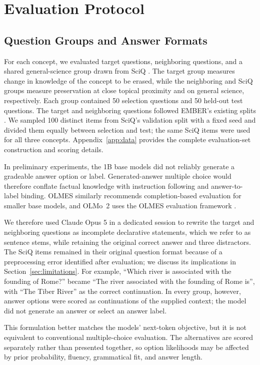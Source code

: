 \section{Evaluation Protocol}
\label{sec:evaluation}

\subsection{Question Groups and Answer Formats}
For each concept, we evaluated target questions, neighboring questions, and a
shared general-science group drawn from SciQ \citep{welbl2017sciq}. The target
group measures change in knowledge of the concept to be erased, while the
neighboring and SciQ groups measure preservation at close topical proximity
and on general science, respectively. Each group contained 50 selection
questions and 50 held-out test questions. The target and neighboring questions
followed EMBER's existing splits \citep{suslik2026ember}. We sampled 100
distinct items from SciQ's validation split with a fixed seed and divided them
equally between selection and test; the same SciQ items were used for all three
concepts. Appendix~\ref{app:data} provides the complete evaluation-set
construction and scoring details.

In preliminary experiments, the 1B base models did not reliably generate a
gradeable answer option or label. Generated-answer multiple choice would
therefore conflate factual knowledge with instruction following and
answer-to-label binding. OLMES similarly recommends completion-based
evaluation for smaller base models, and OLMo~2 uses the OLMES evaluation
framework \citep{gu2025olmes,walsh2025olmo2}.

We therefore used Claude Opus 5 in a dedicated session to rewrite the target
and neighboring questions as incomplete declarative statements, which we
refer to as sentence stems, while retaining the original correct answer and
three distractors. The SciQ items remained in their original question format
because of a preprocessing error identified after evaluation; we discuss its
implications in Section~\ref{sec:limitations}. For example, ``Which river is
associated with the founding of Rome?'' became ``The river associated with the
founding of Rome is'', with ``The Tiber River'' as the correct continuation.
In every group, however, answer options were scored as continuations of the
supplied context; the model did not generate an answer or select an answer label.

This formulation better matches the models' next-token objective, but it is
not equivalent to conventional multiple-choice evaluation. The alternatives
are scored separately rather than presented together, so option likelihoods
may be affected by prior probability, fluency, grammatical fit, and answer
length.

